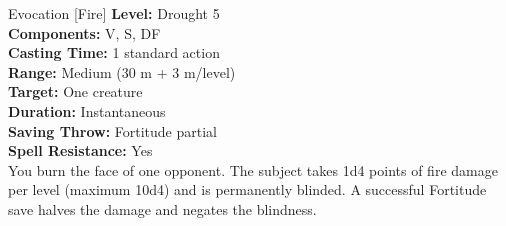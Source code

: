 {Evocation [Fire]}
{
	\textbf{Level:}
	Drought 5\\
	\textbf{Components:}
	V, S, DF\\
	\textbf{Casting Time:}
	1 standard action\\
	\textbf{Range:}
	Medium (30 m + 3 m/level)\\
	\textbf{Target:}
	One creature\\
	\textbf{Duration:}
	Instantaneous\\
	\textbf{Saving Throw:}
	Fortitude partial\\
	\textbf{Spell Resistance:}
	Yes\\
}
{
	You burn the face of one opponent. The subject takes 1d4 points of fire damage per level (maximum 10d4) and is permanently blinded. A successful Fortitude save halves the damage and negates the blindness.
}
